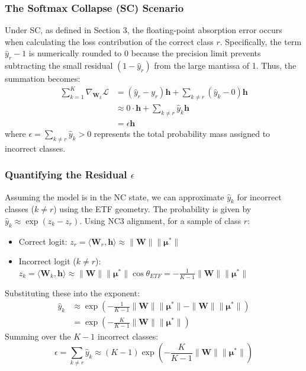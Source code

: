 \documentclass{article}
\theoremstyle{plain}
\theoremstyle{definition}
\theoremstyle{remark}
\begin{document}
\subsubsection{The Softmax Collapse (SC) Scenario}
Under SC, as defined in Section 3, the floating-point absorption error occurs when calculating the loss contribution of the correct class $r$. Specifically, the term $\hat{y}_r - 1$ is numerically rounded to $0$ because the precision limit prevents subtracting the small residual $(1-\hat{y}_r)$ from the large mantissa of 1.
Thus, the summation becomes:
\begin{align}
    \sum_{k=1}^K \nabla_{\bm{W}_k} \mathcal{L} &= (\hat{y}_r - y_r)\bm{h} + \sum_{k \neq r} (\hat{y}_k - 0) \bm{h} \\
    &\approx 0 \cdot \bm{h} + \sum_{k \neq r} \hat{y}_k \bm{h} \\
    &= \epsilon \bm{h}
\end{align}
where $\epsilon = \sum_{k \neq r} \hat{y}_k > 0$ represents the total probability mass assigned to incorrect classes.

\subsubsection{Quantifying the Residual $\epsilon$}
Assuming the model is in the NC state, we can approximate $\hat{y}_k$ for incorrect classes ($k \neq r$) using the ETF geometry.
The probability is given by $\hat{y}_k \approx \exp(z_k - z_r)$.
Using NC3 alignment, for a sample of class $r$:
\begin{itemize}
    \item Correct logit: $z_r = \langle \bm{W}_r, \bm{h} \rangle \approx \|\bm{W}\|\|\bm{\mu}^*\|$
    \item Incorrect logit ($k \neq r$): $z_k = \langle \bm{W}_k, \bm{h} \rangle \approx \|\bm{W}\|\|\bm{\mu}^*\| \cos \theta_{ETF} = -\frac{1}{K-1}\|\bm{W}\|\|\bm{\mu}^*\|$
\end{itemize}
Substituting these into the exponent:
\begin{align}
    \hat{y}_k &\approx \exp\left( -\frac{1}{K-1}\|\bm{W}\|\|\bm{\mu}^*\| - \|\bm{W}\|\|\bm{\mu}^*\| \right) \\
    &= \exp\left( -\frac{K}{K-1}\|\bm{W}\|\|\bm{\mu}^*\| \right)
\end{align}
Summing over the $K-1$ incorrect classes:
\begin{equation}
    \epsilon = \sum_{k \neq r} \hat{y}_k \approx (K-1) \exp\left( -\frac{K}{K-1}\|\bm{W}\|\|\bm{\mu}^*\| \right)
\end{equation}
\end{document}
